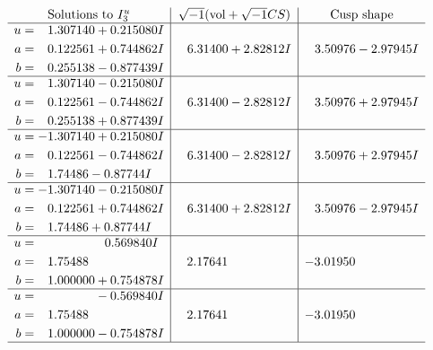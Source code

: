 \documentclass[1p]{elsarticle_modified}
\theoremstyle{definition}
\newcommand{\I}{\sqrt{-1}}
\begin{document}
$$\begin{array}{c|c|c}  
\text{Solutions to }I^u_{3}& \I (\text{vol} + \sqrt{-1}CS) & \text{Cusp shape}\\
 \hline 
\begin{aligned}
u &= \phantom{-}1.307140 + 0.215080 I \\
a &= \phantom{-}0.122561 + 0.744862 I \\
b &= \phantom{-}0.255138 - 0.877439 I\end{aligned}
 & \phantom{-}6.31400 + 2.82812 I & \phantom{-}3.50976 - 2.97945 I \\ \hline\begin{aligned}
u &= \phantom{-}1.307140 - 0.215080 I \\
a &= \phantom{-}0.122561 - 0.744862 I \\
b &= \phantom{-}0.255138 + 0.877439 I\end{aligned}
 & \phantom{-}6.31400 - 2.82812 I & \phantom{-}3.50976 + 2.97945 I \\ \hline\begin{aligned}
u &= -1.307140 + 0.215080 I \\
a &= \phantom{-}0.122561 - 0.744862 I \\
b &= \phantom{-}1.74486 - 0.87744 I\end{aligned}
 & \phantom{-}6.31400 - 2.82812 I & \phantom{-}3.50976 + 2.97945 I \\ \hline\begin{aligned}
u &= -1.307140 - 0.215080 I \\
a &= \phantom{-}0.122561 + 0.744862 I \\
b &= \phantom{-}1.74486 + 0.87744 I\end{aligned}
 & \phantom{-}6.31400 + 2.82812 I & \phantom{-}3.50976 - 2.97945 I \\ \hline\begin{aligned}
u &= \phantom{-0.000000 -}0.569840 I \\
a &= \phantom{-}1.75488\phantom{ +0.000000I} \\
b &= \phantom{-}1.000000 + 0.754878 I\end{aligned}
 & \phantom{-}2.17641\phantom{ +0.000000I} & -3.01950\phantom{ +0.000000I} \\ \hline\begin{aligned}
u &= \phantom{-0.000000 } -0.569840 I \\
a &= \phantom{-}1.75488\phantom{ +0.000000I} \\
b &= \phantom{-}1.000000 - 0.754878 I\end{aligned}
 & \phantom{-}2.17641\phantom{ +0.000000I} & -3.01950\phantom{ +0.000000I}\\
 \hline 
 \end{array}$$\newpage
\end{document}
